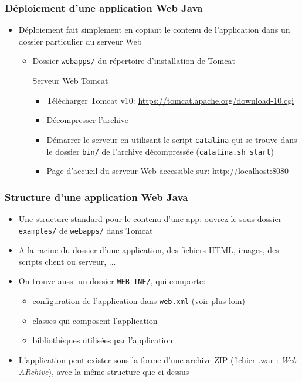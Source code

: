 \documentclass{beamer}
\begin{document}
\begin{frame}
  \frametitle{Déploiement d'une application Web Java}
  \begin{itemize}
  \item Déploiement fait simplement en copiant le contenu de
    l'application dans un dossier particulier du serveur Web
    \begin{itemize}
    \item Dossier \texttt{webapps/} du répertoire d'installation de Tomcat
      \begin{block}{Serveur Web Tomcat}
        \begin{itemize}
        \item Télécharger Tomcat v10: \url{https://tomcat.apache.org/download-10.cgi}
        \item Décompresser l'archive
        \item Démarrer le serveur en utilisant le script
          \texttt{catalina} qui se trouve dans le dossier
          \texttt{bin/} de l'archive décompressée (\texttt{catalina.sh start})
        \item Page d'accueil du serveur Web accessible sur:
          \url{http://localhost:8080}
          \end{itemize}
    \end{block}
    \end{itemize}
  \end{itemize}
\end{frame}

\begin{frame}
  \frametitle{Structure d'une application Web Java}
  \begin{itemize}
  \item Une structure standard pour le contenu d'une app: ouvrez le sous-dossier \texttt{examples/} de \texttt{webapps/} dans Tomcat
  \item A la racine du dossier d'une application, des fichiers HTML,
    images, des scripts client ou serveur, ...
  \item On trouve aussi un dossier \texttt{WEB-INF/}, qui comporte:
    \begin{itemize}
    \item configuration de l'application dans \texttt{web.xml} (voir plus loin)
    \item classes qui composent l'application
    \item bibliothèques utilisées par l'application
    \end{itemize}
  \item L'application peut exister sous la forme d'une archive ZIP
    (fichier .war : \textit{Web ARchive}), avec la même structure que ci-dessus
  \end{itemize}
\end{frame}    
\end{document}
